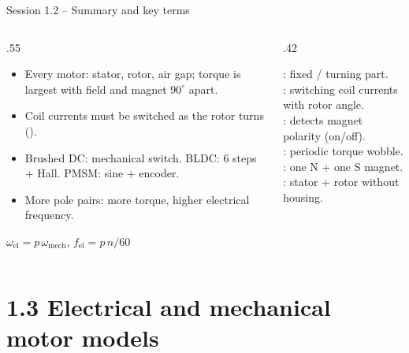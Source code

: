 \documentclass[aspectratio=169,10pt]{beamer}
\begin{document}
\begin{frame}{Session 1.2 -- Summary and key terms}
\begin{columns}[T]
\begin{column}{.55\textwidth}
\small
\begin{itemize}
\item Every motor: stator, rotor, air gap; torque is largest with field and magnet $90^\circ$ apart.
\item Coil currents must be switched as the rotor turns ().
\item Brushed DC: mechanical switch. BLDC: 6 steps + Hall. PMSM: sine + encoder.
\item More pole pairs: more torque, higher electrical frequency.
\end{itemize}
\begin{keybox}[Remember]
$\omega_\text{el}=p\,\omega_\text{mech}$, \quad $f_\text{el}=p\,n/60$
\end{keybox}
\end{column}
\begin{column}{.42\textwidth}
\begin{defbox}
\small
{}: fixed / turning part.\\
: switching coil currents with rotor angle.\\
: detects magnet polarity (on/off).\\
: periodic torque wobble.\\
: one N + one S magnet.\\
: stator + rotor without housing.
\end{defbox}
\end{column}
\end{columns}
\end{frame}

\section{1.3 Electrical and mechanical motor models}
\end{document}
